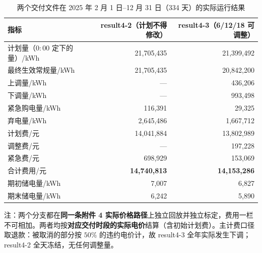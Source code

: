
\begin{table}[htbp]
  \centering
  \caption{两个交付文件在 2025 年 2 月 1 日--12 月 31 日（334 天）的实际运行结果}
  \label{tab:p4-branch}
  \footnotesize
  \begin{tabular}{lrr}
    \toprule
    指标 & result4-2（计划不得修改） & result4-3（6/12/18 可调整） \\
    \midrule
    计划量（$0{:}00$ 定下的量）/kWh & 21,705,435 & 21,399,492 \\
    最终生效常规量/kWh & 21,705,435 & 20,842,200 \\
    上调量/kWh & --- & 436,206 \\
    下调量/kWh & --- & 993,498 \\
    紧急购电量/kWh & 116,391 & 29,325 \\
    \midrule
    弃电量/kWh & 2,645,486 & 1,667,712 \\
    计划费/元 & 14,041,884 & 13,802,989 \\
    调整费/元 & --- & 197,228 \\
    紧急费/元 & 698,929 & 153,069 \\
    合计费用/元 & \textbf{14,740,813} & \textbf{14,153,286} \\
    期初储电量/kWh & 7,007 & 6,827 \\
    期末储电量/kWh & 6,242 & 5,890 \\
    \bottomrule
  \end{tabular}
  \par\vspace{2pt}
  \begin{minipage}{.92\textwidth}\footnotesize
    注：两个分支都在\textbf{同一条附件 4 实际价格路径}上独立回放并独立标定，费用一栏不可相加。两者均按\textbf{对应交付时段的实际电价}结算（含初始计划费）。主计费口径取退款：被取消的部分按 $50\%$ 的违约电价计，故 result4-3 全年实际发生下调；result4-2 全天冻结，无任何调整量。
  \end{minipage}
\end{table}
